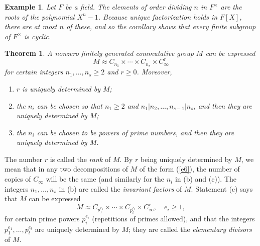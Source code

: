 \documentclass[a4paper,11pt,final,openany]{memoir}%
\newtheorem{theorem}[X]{Theorem}
\newtheorem{example}[X]{Example}
\theoremstyle{nonumberplain}
\begin{document}
\begin{example}
\label{it20b}Let $F$ be a field. The elements of order dividing $n$ in
$F^{\times}$ are the roots of the polynomial $X^{n}-1$. Because unique
factorization holds in $F[X]$, there are at most $n$ of these, and so the
corollary shows that every finite subgroup of $F^{\times}$ is cyclic.
\end{example}

\begin{theorem}
\label{it21}%
%
A nonzero finitely generated commutative group $M$ can be expressed%
\begin{equation}
M\approx C_{n_{1}}\times\cdots\times C_{n_{s}}\times C_{\infty}^{r} \label{e6}%
\end{equation}
for certain integers $n_{1},\ldots,n_{s}\geq2$ and $r\geq0$. Moreover,

\begin{enumerate}
\item $r$ is uniquely determined by $M$;

\item the $n_{i}$ can be chosen so that $n_{1}\geq2$ and $n_{1}|n_{2}%
,\ldots,n_{s-1}|n_{s}$, and then they are uniquely determined by $M$;

\item the $n_{i}$ can be chosen to be powers of prime numbers, and then they
are uniquely determined by $M$.
\end{enumerate}
\end{theorem}

The number $r$ is called the \emph{rank}%
of $M$. By $r$ being uniquely determined by $M$, we mean that in any two
decompositions of $M$ of the form (\ref{e6}), the number of copies of
$C_{\infty}$ will be the same (and similarly for the $n_{i}$ in (b) and (c)).
The integers $n_{1},\ldots,n_{s}$ in (b) are called the \emph{invariant
factors}%
of $M$. Statement (c) says that $M$ can be expressed%
\begin{equation}
M\approx C_{p_{1}^{e_{1}}}\times\cdots\times C_{p_{t}^{e_{t}}}\times
C_{\infty}^{r},\quad e_{i}\geq1, \label{e7}%
\end{equation}
for certain prime powers $p_{i}^{e_{i}}$ (repetitions of primes allowed), and
that the integers $p_{1}^{e_{1}},\ldots,p_{t}^{e_{t}}$ are uniquely determined
by $M$; they are called the \emph{elementary divisors}%
of $M$.
\end{document}
